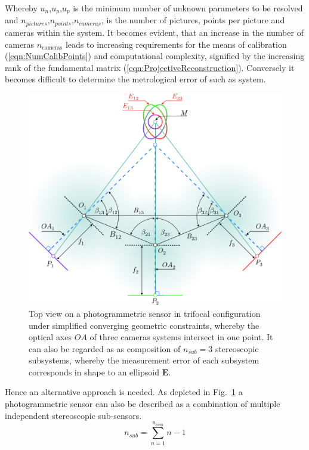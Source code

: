 \documentclass[5p,times,procedia]{elsarticle}
\begin{document}
Whereby $u_n$,$u_p$,$u_p$ is the minimum number of unknown parameters to be resolved and $n_{pictures}$,$n_{points}$,$n_{cameras}$, is the 
number of pictures, points per picture and cameras within the system. It becomes evident, that an increase in the number of cameras $n_{\text{cameras}}$ leads to increasing requirements for the means of calibration (\ref{eqn:NumCalibPoints}) and computational complexity, signified by the increasing rank of the fundamental matrix (\ref{eqn:ProjectiveReconstruction}). Conversely it becomes difficult to determine the metrological error of such as system.\\
%
\begin{figure}[h]
	\centering
	\includegraphics[width=0.95\linewidth]{graphics/MixedErrorCuttingGeometry.eps}
	\caption{Top view on a photogrammetric sensor in trifocal configuration under simplified converging geometric constraints, whereby the optical axes $OA$ of three cameras systems intersect in one point.		
		It can also be regarded as as composition of $n_{sub}=3$ stereoscopic subsystems, whereby the measurement error of each subsystem corresponds in shape to an ellipsoid $\mathbf{E}$.}
	\label{fig:sub_sensors}
\end{figure}
%
Hence an alternative approach is needed. As depicted in  Fig.~\ref{fig:sub_sensors} a photogrammetric sensor can also be described as a combination of multiple independent stereoscopic sub-sensors.
%
\begin{equation}
	\label{eqn:CovarianceMatrix}
	n_{sub} = \sum_{n=1}^{n_{cam}}n-1
\end{equation}
\end{document}
